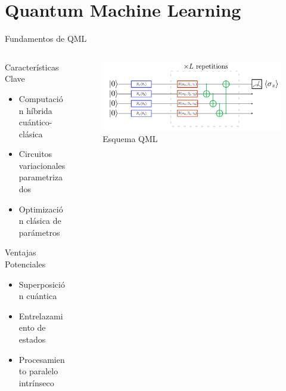 \documentclass[aspectratio=169]{beamer}
\begin{document}
\section{Quantum Machine Learning}
\begin{frame}{Fundamentos de QML}
  \begin{columns}
    \begin{column}{0.5\textwidth}
      \begin{block}{Características Clave}
        \begin{itemize}
          \item Computación híbrida cuántico-clásica
          \item Circuitos variacionales parametrizados
          \item Optimización clásica de parámetros
        \end{itemize}
      \end{block}
      \begin{alertblock}{Ventajas Potenciales}
        \begin{itemize}
          \item Superposición cuántica
          \item Entrelazamiento de estados
          \item Procesamiento paralelo intrínseco
        \end{itemize}
      \end{alertblock}
    \end{column}
    \begin{column}{0.5\textwidth}
      \begin{figure}
        \includegraphics[width=\textwidth]{angleemb.png}
        \caption{Esquema QML}
      \end{figure}
    \end{column}
  \end{columns}
\end{frame}
\end{document}
